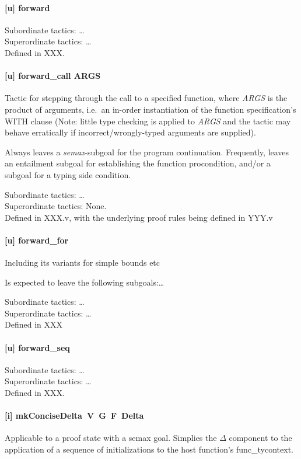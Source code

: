 \documentclass[12pt,fleqn,openany,oneside,showtrims]{memoir}
\begin{document}
\paragraph{[u] forward}

Subordinate tactics: \ldots\\
Superordinate tactics: \ldots\\
Defined in XXX.

\paragraph{[u] forward\_call ARGS}
Tactic for stepping through the call to a specified function, where
\emph{ARGS} is the product of arguments, i.e.~an in-order
instantiation of the function specification's WITH clause (Note:
little type checking is applied to \emph{ARGS} and the tactic may
behave erratically if incorrect/wrongly-typed arguments are supplied).

Always leaves a \emph{semax}-subgoal for the program
continuation.  Frequently, leaves an entailment subgoal for
establishing the function procondition, and/or a subgoal for a typing
side condition.

Subordinate tactics: \ldots\\
Superordinate tactics: None.\\
Defined in XXX.v, with the underlying proof rules being defined in YYY.v

\paragraph{[u] forward\_for}

Including its variants for simple bounds etc

Is expected to leave the following subgoals:\ldots

Subordinate tactics: \ldots\\
Superordinate tactics: \ldots\\
Defined in XXX


\paragraph{[u] forward\_seq}

Subordinate tactics: \ldots\\
Superordinate tactics: \ldots\\
Defined in XXX.

\paragraph{[i] mkConciseDelta\ V\ G\ F\ Delta}
Applicable to a proof state with a semax goal. Simplies the $\Delta$
component to the application of a sequence of initializations to the
host function's func\_tycontext.
\end{document}
